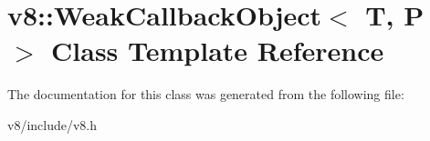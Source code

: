 \hypertarget{classv8_1_1WeakCallbackObject}{}\section{v8\+:\+:Weak\+Callback\+Object$<$ T, P $>$ Class Template Reference}
\label{classv8_1_1WeakCallbackObject}


The documentation for this class was generated from the following file\+:\begin{DoxyCompactItemize}
\item 
v8/include/v8.\+h\end{DoxyCompactItemize}
